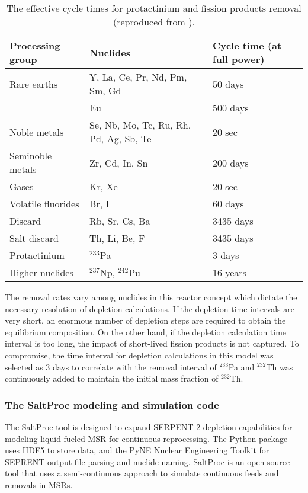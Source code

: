 \begin{table}[ht!]
        \centering
        \caption{The effective cycle times for protactinium and fission 
        products removal (reproduced from \cite{robertson_conceptual_1971}).}
        \begin{tabularx}{\textwidth}{ x | s | x }
        \hline Processing group & \qquad\qquad\qquad Nuclides & Cycle time (at 
                full power) \\ \hline Rare earths & Y, La, Ce, Pr, Nd, Pm, Sm, 
                Gd & 50 days \\ \qquad & Eu & 500 days \\ Noble metals & Se, 
                Nb, Mo, Tc, Ru, Rh, Pd, Ag, Sb, Te & 20 sec \\
        Seminoble metals & Zr, Cd, In, Sn & 200 days \\
        Gases & Kr, Xe & 20 sec \\ Volatile fluorides & Br, I & 60 days \\
        Discard & Rb, Sr, Cs, Ba & 3435 days \\ Salt discard & Th, Li, Be, F & 
                3435 days \\ Protactinium & $^{233}$Pa & 3 days \\ Higher 
                nuclides & $^{237}$Np, $^{242}$Pu & 16 years \\  \hline
        \end{tabularx}
        \label{tab:reprocessing_list}
\end{table}
The removal rates vary among nuclides in this reactor concept which dictate the 
necessary resolution of depletion calculations. If the depletion time intervals 
are very short, an enormous number of depletion steps are required to obtain 
the equilibrium composition. On the other hand, if the depletion  calculation 
time interval is too long, the impact of short-lived fission products is not 
captured. To compromise, the time interval for depletion calculations in this 
model was selected as 3 days to correlate with the removal interval of 
$^{233}$Pa and $^{232}$Th was continuously added to maintain the initial mass 
fraction of $^{232}$Th.

\subsubsection{The SaltProc modeling and simulation code}
The SaltProc tool \cite{rykhlevskii_arfc/saltproc:_2018} is designed to 
expand SERPENT 2
 depletion capabilities for modeling liquid-fueled \gls{MSR} for continuous 
 reprocessing.
The Python package uses HDF5 \cite{the_hdf_group_hierarchical_1997} to store 
data, and the PyNE Nuclear Engineering Toolkit \cite{scopatz_pyne:_2012}
for SEPRENT output file parsing and nuclide naming. SaltProc is an open-source tool 
that uses a semi-continuous approach to simulate continuous feeds and removals 
in \glspl{MSR}. 

